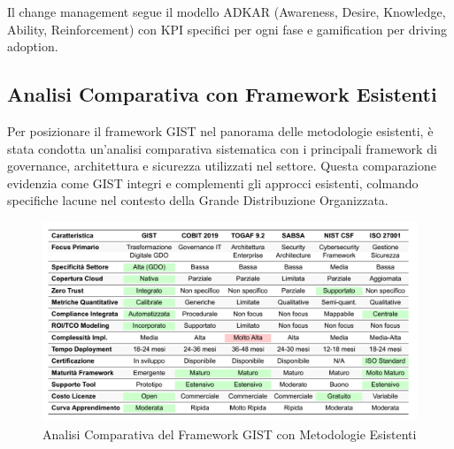 Il change management segue il modello ADKAR (Awareness, Desire, Knowledge, Ability, Reinforcement) con KPI specifici per ogni fase e gamification per driving adoption.

\subsection{\texorpdfstring{Analisi Comparativa con Framework Esistenti}{5.4.4 - Analisi Comparativa con Framework Esistenti}}
\label{subsec:5.4.4}
Per posizionare il framework GIST nel panorama delle metodologie
esistenti, è stata condotta un’analisi comparativa sistematica con i principali framework di governance, architettura e sicurezza utilizzati nel settore. Questa comparazione evidenzia come GIST integri e complementi gli
approcci esistenti, colmando specifiche lacune nel contesto della Grande
Distribuzione Organizzata.
\begin{figure}[htbp]
\centering
\includegraphics[width=1.1\textwidth]{thesis_figures/cap5/Tab5_1_comparazione .pdf}
\caption{Analisi Comparativa del Framework GIST con Metodologie
Esistenti}
\label{fig:tab5_1_comparison}
\end{figure}

